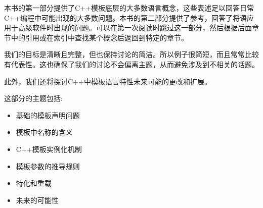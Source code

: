 本书的第一部分提供了C++模板底层的大多数语言概念，这些表述足以回答日常C++编程中可能出现的大多数问题。本书的第二部分提供了参考，回答了将语应用于高级软件时出现的问题。可以在第一次阅读时跳过这一部分，然后根据后面章节中的引用或在索引中查找某个概念后返回到特定的章节。

我们的目标是清晰且完整，但也保持讨论的简洁。所以例子很简短，而且常常比较有代表性。这也确保了我们的讨论不会偏离主题，从而避免涉及到不相关的话题。

此外，我们还将探讨C++中模板语言特性未来可能的更改和扩展。

这部分的主题包括:

\begin{itemize}
\item 
基础的模板声明问题

\item 
模板中名称的含义

\item 
C++模板实例化机制

\item 
模板参数的推导规则

\item 
特化和重载

\item 
未来的可能性
\end{itemize}
	
	
	
	
	